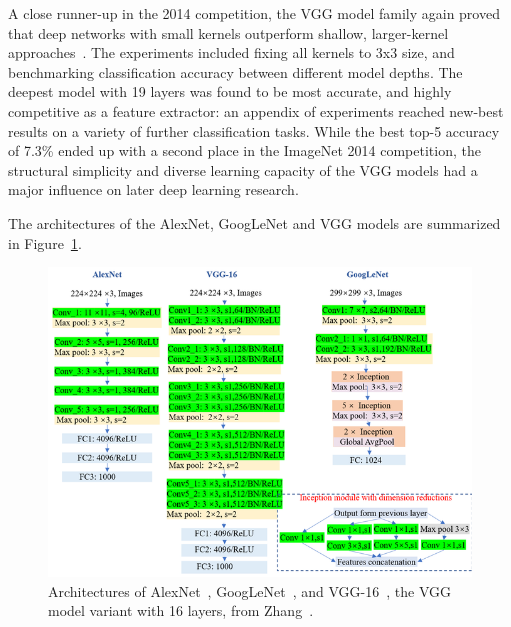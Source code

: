 \documentclass[english,twoside,openright]{UH_DS_MSc}
\begin{document}
A close runner-up in the 2014 competition, the VGG model family again proved that deep networks 
with small kernels outperform shallow, larger-kernel approaches~\cite{vgg}. The experiments included fixing all kernels to 3x3 size, and benchmarking classification accuracy between 
different model depths. The deepest model with 19 layers was found to be most accurate, and highly competitive as a feature extractor: an appendix of experiments reached new-best results on a variety of 
further classification tasks. While the 
best top-5 accuracy of 7.3\% ended up with a second place in the ImageNet 2014 competition, the structural simplicity
and diverse learning capacity of the VGG models had a major influence on later deep learning research.

The architectures of the AlexNet, GoogLeNet and VGG models are summarized in Figure~\ref{image:famouscnns}.

\begin{figure}[ht]
    \centering
    \includegraphics*[scale=0.6]{images/famouscnns.png}
    \caption{Architectures of AlexNet~\cite{alexnet}, GoogLeNet~\cite{googlelenet}, and VGG-16~\cite{vgg}, the 
    VGG model variant with 16 layers, from Zhang~\cite{zhangImagebasedMethodsDietary2023}.}
    \label{image:famouscnns}
\end{figure}
\end{document}
